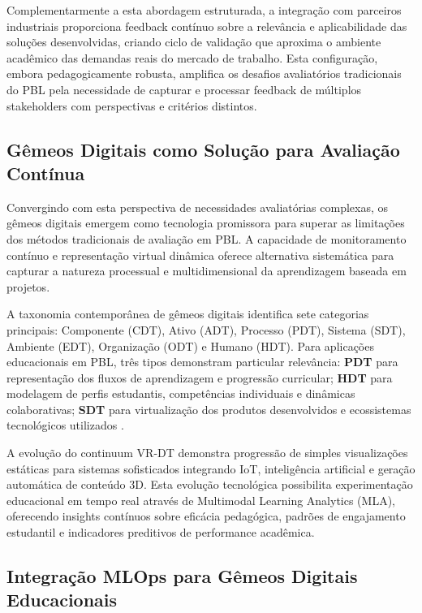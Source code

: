\documentclass[english, spanish, brazilian]{RBIEarticle} %
\begin{document}
Complementarmente a esta abordagem estruturada, a integração com parceiros
industriais proporciona feedback contínuo sobre a relevância e aplicabilidade
das soluções desenvolvidas, criando ciclo de validação que aproxima o ambiente
acadêmico das demandas reais do mercado de trabalho. Esta configuração, embora
pedagogicamente robusta, amplifica os desafios avaliatórios tradicionais do PBL
pela necessidade de capturar e processar feedback de múltiplos stakeholders com
perspectivas e critérios distintos.

\subsection{Gêmeos Digitais como Solução para Avaliação Contínua}

Convergindo com esta perspectiva de necessidades avaliatórias complexas, os
gêmeos digitais emergem como tecnologia promissora para superar as limitações
dos métodos tradicionais de avaliação em PBL. A capacidade de monitoramento
contínuo e representação virtual dinâmica oferece alternativa sistemática para
capturar a natureza processual e multidimensional da aprendizagem baseada em
projetos.

A taxonomia contemporânea de gêmeos digitais identifica sete categorias
principais: Componente (CDT), Ativo (ADT), Processo (PDT), Sistema (SDT),
Ambiente (EDT), Organização (ODT) e Humano (HDT). Para aplicações educacionais
em PBL, três tipos demonstram particular relevância: \textbf{PDT} para
representação dos fluxos de aprendizagem e progressão curricular; \textbf{HDT}
para modelagem de perfis estudantis, competências individuais e dinâmicas
colaborativas; \textbf{SDT} para virtualização dos produtos desenvolvidos e
ecossistemas tecnológicos utilizados \cite{DigitalTwinsEducation2024}.

A evolução do continuum VR-DT demonstra progressão de simples visualizações
estáticas para sistemas sofisticados integrando IoT, inteligência artificial e
geração automática de conteúdo 3D. Esta evolução tecnológica possibilita
experimentação educacional em tempo real através de Multimodal Learning
Analytics (MLA), oferecendo insights contínuos sobre eficácia pedagógica,
padrões de engajamento estudantil e indicadores preditivos de performance
acadêmica.

\subsection{Integração MLOps para Gêmeos Digitais Educacionais}
\end{document}
